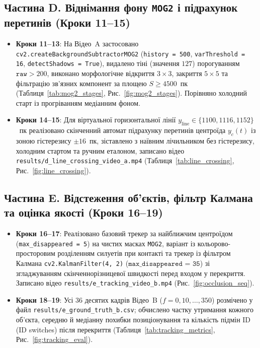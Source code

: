 \documentclass[14pt, a4paper]{extarticle}
\begin{document}
\subsection{Частина D. Віднімання фону \texttt{MOG2} і підрахунок перетинів (Кроки 11--15)}
\begin{itemize}
    \item \textbf{Кроки 11--13}: На Відео~A застосовано \texttt{cv2.\allowbreak create\allowbreak Background\allowbreak Subtractor\allowbreak MOG2} (\texttt{history = 500}, \texttt{varThreshold = 16}, \texttt{detect\allowbreak Shadows = True}), видалено тіні (значення $127$) порогуванням $\texttt{raw} > 200$, виконано морфологічне відкриття $3 \times 3$, закриття $5 \times 5$ та фільтрацію зв'язних компонент за площею $S \ge 4500$~пк (Таблиця~\ref{tab:mog2_stages}, Рис.~\ref{fig:mog2_stages}). Порівняно холодний старт із прогріванням медіанним фоном.
    \item \textbf{Кроки 14--15}: Для віртуальної горизонтальної лінії $y_{\text{line}} \in \{1100, 1116, 1152\}$~пк реалізовано скінченний автомат підрахунку перетинів центроїда $y_c(t)$ із зоною гістерезису $\pm 16$~пк, зіставлено з наївним лічильником без гістерезису, холодним стартом та ручним еталоном, записано відео \texttt{results/d\_line\_crossing\_video\_a.mp4} (Таблиця~\ref{tab:line_crossing}, Рис.~\ref{fig:line_crossing}).
\end{itemize}

\subsection{Частина E. Відстеження об'єктів, фільтр Калмана та оцінка якості (Кроки 16--19)}
\begin{itemize}
    \item \textbf{Кроки 16--17}: Реалізовано базовий трекер за найближчим центроїдом (\texttt{max\_disappeared = 5}) на чистих масках \texttt{MOG2}, варіант із кольорово-просторовим розділенням силуетів при контакті та трекер із фільтром Калмана \texttt{cv2.KalmanFilter(4, 2)} ($\texttt{max\_disappeared = 35}$) зі згладжуванням скінченнорізницевої швидкості перед входом у перекриття. Записано відео \texttt{results/e\_tracking\_video\_b.mp4} (Рис.~\ref{fig:occlusion_seq}).
    \item \textbf{Кроки 18--19}: Усі $36$ десятих кадрів Відео~B ($f = 0, 10, \dots, 350$) розмічено у файл \texttt{results/e\_ground\_truth\_b.csv}; обчислено частку утримання кожного об'єкта, середню й медіанну похибки позиціонування та кількість підмін ID (ID switches) після перекриття (Таблиця~\ref{tab:tracking_metrics}, Рис.~\ref{fig:tracking_eval}).
\end{itemize}
\end{document}
